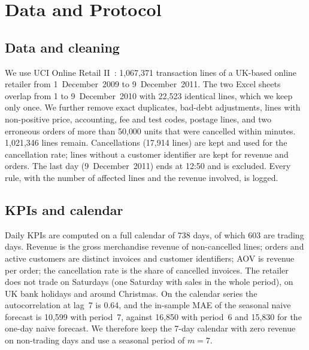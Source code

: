 \documentclass[conference]{IEEEtran}
\begin{document}
\section{Data and Protocol}
\subsection{Data and cleaning}
We use UCI Online Retail II~\cite{chen2012dataset}: 1,067,371 transaction lines %
of a UK-based online retailer from 1~December~2009 to 9~December~2011. The two Excel sheets overlap from 1
to 9~December~2010 with 22,523 identical lines, %
which we keep only once. We further remove exact duplicates, bad-debt adjustments, lines with non-positive
price, accounting, fee and test codes, postage lines, and two erroneous orders of more than 50{,}000 units
that were cancelled within minutes. 1,021,346 lines remain. %
Cancellations (17,914 lines) %
are kept and used for the cancellation rate; lines without a customer identifier are kept for revenue and
orders. The last day (9~December~2011) ends at 12:50 and is excluded. Every rule, with the number of affected
lines and the revenue involved, is logged.

\subsection{KPIs and calendar}
Daily KPIs are computed on a full calendar of 738 days, of which 603 are trading days. %
Revenue is the gross merchandise revenue of non-cancelled lines; orders and active customers are distinct
invoices and customer identifiers; AOV is revenue per order; the cancellation rate is the share of cancelled
invoices. The retailer does not trade on Saturdays (one Saturday with sales in the whole period), %
on UK bank holidays and around Christmas. On the calendar series the autocorrelation at lag~7 is 0.64, %
and the in-sample MAE of the seasonal naive forecast is 10,599 with period~7, against 16,850 with period~6 %
and 15,830 for the one-day naive forecast. %
We therefore keep the 7-day calendar with zero revenue on non-trading days and use a seasonal period of
$m=7$.
\end{document}

